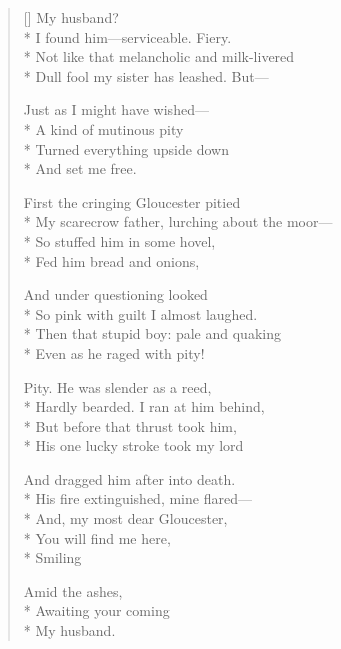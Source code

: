 \label{ch:lear_ao}
\settowidth{\versewidth}{My scarecrow father, lurching about the moor---}
\begin{verse}[\versewidth]
 My husband?\\*
I found him---serviceable. Fiery.\\*
Not like that melancholic and milk-livered\\*
Dull fool my sister has leashed. But---

Just as I might have wished---\\*
A kind of mutinous pity\\*
Turned everything upside down\\*
And set me free.

First the cringing Gloucester pitied\\*
My scarecrow father, lurching about the moor---\\*
So stuffed him in some hovel,\\*
Fed him bread and onions,

And under questioning looked\\*
So pink with guilt I almost laughed.\\*
Then that stupid boy: pale and quaking\\*
Even as he raged with pity!

Pity.  He was slender as a reed,\\*
Hardly bearded. I ran at him behind,\\*
But before that thrust took him,\\*
His one lucky stroke took my lord

And dragged him after into death.\\*
His fire extinguished, mine flared---\\*
And, my most dear Gloucester,\\*
You will find me here,\\*
\qquad \qquad \qquad Smiling

Amid the ashes,\\*
\qquad \qquad Awaiting your coming\\*
My husband.
\end{verse}
